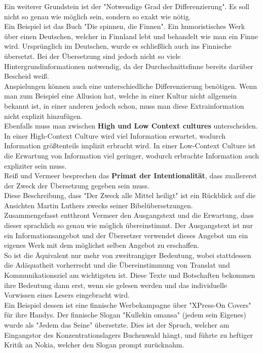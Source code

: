 \documentclass{article}
\begin{document}
	Ein weiterer Grundstein ist der "Notwendige Grad der Differenzierung". Es soll nicht so genau wie möglich sein, sondern so exakt wie nötig. \\
	Ein Beispiel ist das Buch "Die spinnen, die Finnen". Ein humoristisches Werk über einen Deutschen, welcher in Finnland lebt und behandelt wie man ein Finne wird. Ursprünglich im Deutschen, wurde es schließlich auch ins Finnische übersetzt. Bei der Übersetzung sind jedoch nicht so viele Hintergrundinformationen notwendig, da der Durchschnittsfinne bereits darüber Bescheid weiß. \\
	Anspielungen können auch eine unterschiedliche Differenzierung benötigen. Wenn man zum Beispiel eine Allusion hat, welche in einer Kultur nicht allgemein bekannt ist, in einer anderen jedoch schon, muss man diese Extrainformation nicht explizit hinzufügen. \\
	Ebenfalls muss man zwischen \textbf{High und Low Context cultures} unterscheiden. In einer High-Context Culture wird viel Information erwartet, wodurch Information größtenteils implizit erbracht wird. In einer Low-Context Culture ist die Erwartung von Information viel geringer, wodurch erbrachte Information auch expliziter sein muss. \\
	Reiß und Vermeer besprechen das \textbf{Primat der Intentionalität}, dass zuallererst der Zweck der Übersetzung gegeben sein muss. \\
	Diese Beschreibung, dass "Der Zweck alle Mittel heiligt" ist ein Rückblick auf die Ansichten Martin Luthers zwecks seiner Bibelübersetzungen. \\
	Zusammengefasst entthront Vermeer den Ausgangstext und die Erwartung, dass dieser sprachlich so genau wie möglich übereinstimmt. Der Ausgangstext ist nur ein Informationsangebot und der Übersetzer verwendet dieses Angebot um ein eigenes Werk mit dem möglichst selben Angebot zu erschaffen. \\
	So ist die Äquivalent nur mehr von zweitrangiger Bedeutung, wobei stattdessen die Adäquatheit vorherrscht und die Übereinstimmung von Translat und Kommunikationsziel am wichtigsten ist. Diese Texte und Botschaften bekommen ihre Bedeutung dann erst, wenn sie gelesen werden und das individuelle Vorwissen eines Lesers eingebracht wird. \\
	Ein Beispiel dessen ist eine finnische Werbekampagne über "XPress-On Covers" für ihre Handys. Der finnische Slogan "Kullekin omansa" (jedem sein Eigenes) wurde als "Jedem das Seine" übersetzte. Dies ist der Spruch, welcher am Eingangstor des Konzentrationslagers Buchenwald hängt, und führte zu heftiger Kritik an Nokia, welcher den Slogan prompt zurücknahm. \\
\end{document}
